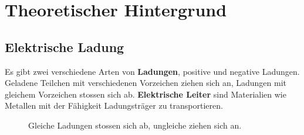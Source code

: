 \section{Theoretischer Hintergrund}
\subsection{Elektrische Ladung}
Es gibt zwei verschiedene Arten von \textbf{Ladungen}, positive und negative Ladungen. Geladene Teilchen mit verschiedenen Vorzeichen ziehen sich an, Ladungen mit gleichem Vorzeichen stossen sich ab. \textbf{Elektrische Leiter} sind Materialien wie Metallen mit der Fähigkeit Ladungsträger zu transportieren. 
\begin{figure}[H]
\centering
{}
\caption{Gleiche Ladungen stossen sich ab, ungleiche ziehen sich an.}
\end{figure}
